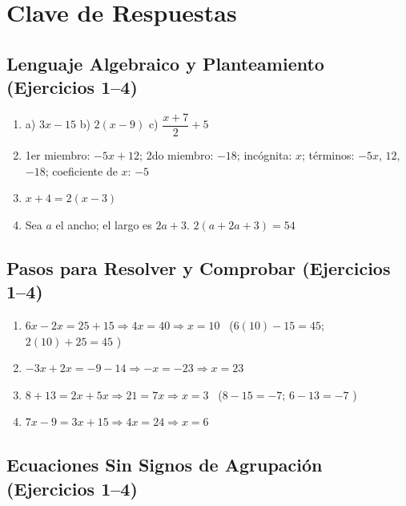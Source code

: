 \documentclass[12pt, letterpaper]{article}
\begin{document}
\newpage

\ifmwclaves
  \section{Clave de Respuestas}

  \subsection*{Lenguaje Algebraico y Planteamiento (Ejercicios 1--4)}

  \begin{enumerate}[leftmargin=*, label=\textbf{\arabic*.}]
    \item a) $3x - 15$ \quad b) $2(x - 9)$ \quad c) $\dfrac{x + 7}{2} + 5$
    \item 1er miembro: $-5x + 12$; 2do miembro: $-18$; incógnita: $x$; términos: $-5x$, $12$, $-18$; coeficiente de $x$: $-5$
    \item $x + 4 = 2(x - 3)$
    \item Sea $a$ el ancho; el largo es $2a + 3$. $2(a + 2a + 3) = 54$
  \end{enumerate}

  \subsection*{Pasos para Resolver y Comprobar (Ejercicios 1--4)}

  \begin{enumerate}[leftmargin=*, label=\textbf{\arabic*.}]
    \item $6x - 2x = 25 + 15 \Rightarrow 4x = 40 \Rightarrow x = 10$ \ ($6(10) - 15 = 45$; $2(10) + 25 = 45$ \checkmark)
    \item $-3x + 2x = -9 - 14 \Rightarrow -x = -23 \Rightarrow x = 23$
    \item $8 + 13 = 2x + 5x \Rightarrow 21 = 7x \Rightarrow x = 3$ \ ($8 - 15 = -7$; $6 - 13 = -7$ \checkmark)
    \item $7x - 9 = 3x + 15 \Rightarrow 4x = 24 \Rightarrow x = 6$
  \end{enumerate}

  \subsection*{Ecuaciones Sin Signos de Agrupación (Ejercicios 1--4)}
\end{document}
